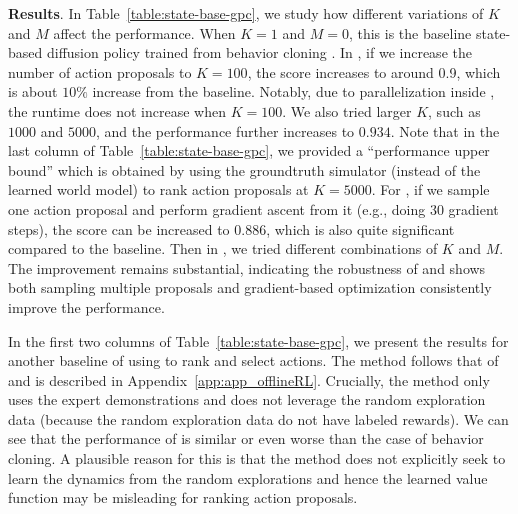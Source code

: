 \textbf{Results}. 
In Table~\ref{table:state-base-gpc}, we study how different variations of $K$ and $M$ affect the performance. When $K=1$ and $M=0$, this is the baseline state-based diffusion policy trained from behavior cloning \cite{chi2023diffusion}. In \gpcrank, if we increase the number of action proposals to $K=100$, the score increases to around 0.9, which is about $10\%$ increase from the baseline. Notably, due to parallelization inside \gpcrank, the runtime does not increase when $K=100$. We also tried larger $K$, such as $1000$ and $5000$, and the performance further increases to $0.934$. Note that in the last column of Table~\ref{table:state-base-gpc}, we provided a ``performance upper bound'' which is obtained by using the groundtruth simulator (instead of the learned world model) to rank action proposals at $K=5000$.
For \gpcopt, if we sample one action proposal and perform gradient ascent from it (e.g., doing $30$ gradient steps), the score can be increased to $0.886$, which is also quite significant compared to the baseline. Then in \gpcrankopt, we tried different combinations of $K$ and $M$. The improvement remains substantial, indicating the robustness of \nameshort and shows both sampling multiple proposals and gradient-based optimization consistently improve the performance.  

In the first two columns of Table~\ref{table:state-base-gpc}, we present the results for another baseline of using \offlinerl to rank and select actions. The \offlinerl method follows that of~\cite{nakamoto2024steering} and is described in Appendix~\ref{app:app_offlineRL}. Crucially, the \offlinerl method only uses the expert demonstrations and does not leverage the random exploration data (because the random exploration data do not have labeled rewards). We can see that the performance of \offlinerl is similar or even worse than the case of behavior cloning. A plausible reason for this is that the \offlinerl method does not explicitly seek to learn the dynamics from the random explorations and hence the learned value function may be misleading for ranking action proposals.


